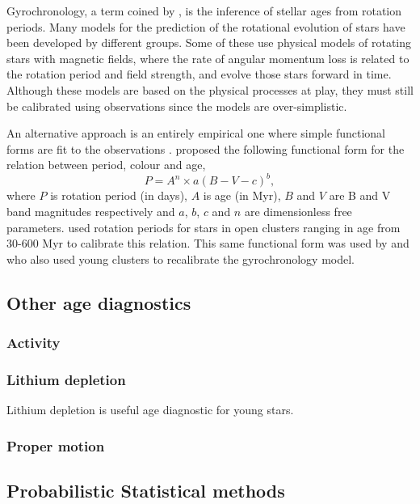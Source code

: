 Gyrochronology, a term coined by \citet{Barnes2003}, is the inference of
stellar ages from rotation periods.
Many models for the prediction of the rotational evolution of stars have been
developed by different groups.
Some of these \citep[\eg][]{Vansaders, Reiners2012, Brown} use physical models
of rotating stars with magnetic fields, where the rate of angular momentum
loss is related to the rotation period and field strength, and evolve those
stars forward in time.
Although these models are based on the physical processes at play, they must
still be calibrated using observations since the models are over-simplistic.

An alternative approach is an entirely empirical one where simple functional
forms are fit to the observations \citep[\eg][]{Barnes2007, Mamajek2008,
Meibom2010}.
\citet{Barnes2003} proposed the following functional form for the relation
between period, colour and age, \begin{equation} \label{eq:Barnes2007_2} P =
A^n \times a(B-V-c)^b, \end{equation} where $P$ is rotation period (in days),
$A$ is age (in Myr), $B$ and $V$ are B and V band magnitudes respectively and
$a$, $b$, $c$ and $n$ are dimensionless free parameters.
\citet{Barnes2007} used rotation periods for stars in open clusters ranging in
age from 30-600 Myr to calibrate this relation.
This same functional form was used by \citet{Mamajek2008} and
\citet{Meibom2010} who also used young clusters to recalibrate the
gyrochronology model.

\subsection*{Other age diagnostics}

\subsubsection*{Activity}

\subsubsection*{Lithium depletion}
Lithium depletion is useful age diagnostic for young stars.

\subsubsection*{Proper motion}

\subsection*{Probabilistic Statistical methods}


